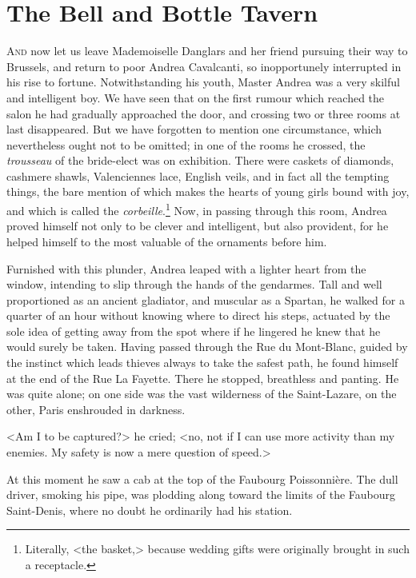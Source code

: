 \chapter{The Bell and Bottle Tavern} 

 \lettrine{A}{nd} now let us leave Mademoiselle Danglars and her friend pursuing their way to Brussels, and return to poor Andrea Cavalcanti, so inopportunely interrupted in his rise to fortune. Notwithstanding his youth, Master Andrea was a very skilful and intelligent boy. We have seen that on the first rumour which reached the salon he had gradually approached the door, and crossing two or three rooms at last disappeared. But we have forgotten to mention one circumstance, which nevertheless ought not to be omitted; in one of the rooms he crossed, the \textit{trousseau} of the bride-elect was on exhibition. There were caskets of diamonds, cashmere shawls, Valenciennes lace, English veils, and in fact all the tempting things, the bare mention of which makes the hearts of young girls bound with joy, and which is called the \textit{corbeille}.\footnote{Literally, <the basket,> because wedding gifts were originally brought in such a receptacle.} Now, in passing through this room, Andrea proved himself not only to be clever and intelligent, but also provident, for he helped himself to the most valuable of the ornaments before him. 

 Furnished with this plunder, Andrea leaped with a lighter heart from the window, intending to slip through the hands of the gendarmes. Tall and well proportioned as an ancient gladiator, and muscular as a Spartan, he walked for a quarter of an hour without knowing where to direct his steps, actuated by the sole idea of getting away from the spot where if he lingered he knew that he would surely be taken. Having passed through the Rue du Mont-Blanc, guided by the instinct which leads thieves always to take the safest path, he found himself at the end of the Rue La Fayette. There he stopped, breathless and panting. He was quite alone; on one side was the vast wilderness of the Saint-Lazare, on the other, Paris enshrouded in darkness. 

 <Am I to be captured?> he cried; <no, not if I can use more activity than my enemies. My safety is now a mere question of speed.> 

 At this moment he saw a cab at the top of the Faubourg Poissonnière. The dull driver, smoking his pipe, was plodding along toward the limits of the Faubourg Saint-Denis, where no doubt he ordinarily had his station. 

